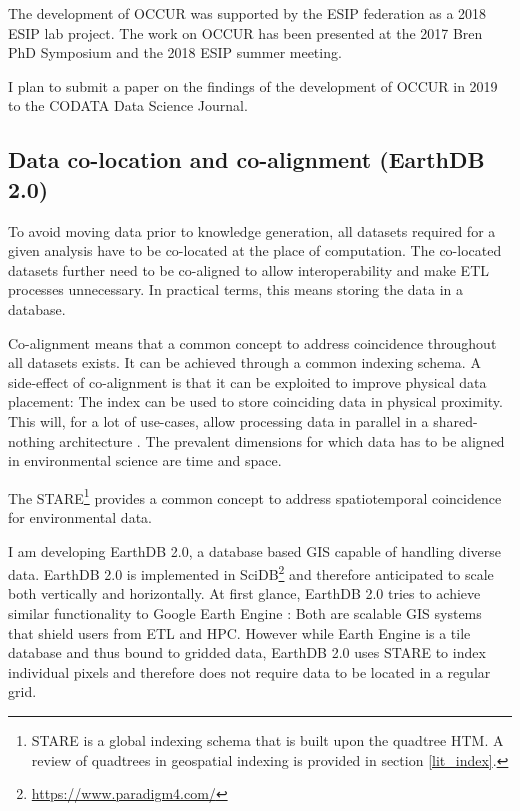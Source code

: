 \documentclass[letterpaper, parskip=half]{scrartcl}
\begin{document}
The development of \gls{OCCUR} was supported by the \gls{ESIP} federation as a 2018 \gls{ESIP} lab project. The work on \gls{OCCUR} has been presented at the 2017 Bren PhD Symposium and the 2018 \gls{ESIP} summer meeting.

I plan to submit a paper on the findings of the development of OCCUR in 2019 to the CODATA Data Science Journal.
% 
\newpage

\subsection{Data co-location and co-alignment (EarthDB 2.0)}
To avoid moving data prior to knowledge generation, all datasets required for a given analysis have to be co-located at the place of computation. The co-located datasets further need to be co-aligned to allow interoperability \citep{Kuo2017, Rilee2016} and make \gls{ETL} processes unnecessary. In practical terms, this means storing the data in a database.

Co-alignment means that a common concept to address coincidence throughout all datasets exists. 
It can be achieved through a common indexing schema. A side-effect of co-alignment is that it can be exploited to improve physical data placement: The index can be used to store coinciding data in physical proximity. This will, for a lot of use-cases, allow processing data in parallel in a shared-nothing architecture \citep{Kuo2017}.
The prevalent dimensions for which data has to be aligned in environmental science are time and space.
 
The \gls{STARE}\footnote{STARE is a global indexing schema that is built upon the quadtree \gls{HTM}. A review of quadtrees in geospatial indexing is provided in section \ref{lit_index}.} \citep{Kuo2017} provides a common concept to address spatiotemporal coincidence for environmental data.

I am developing EarthDB 2.0, a database based \gls{GIS} capable of handling diverse data. 
EarthDB 2.0 is implemented in SciDB\footnote{\url{https://www.paradigm4.com/}} and therefore anticipated to scale both vertically and horizontally.
At first glance, EarthDB 2.0 tries to achieve similar functionality to Google Earth Engine \citep{Gorelick2017}: Both are scalable \gls{GIS} systems that shield users from \gls{ETL} and \gls{HPC}. However while Earth Engine is a tile database and thus bound to gridded data, EarthDB 2.0 uses \gls{STARE} to index individual pixels and therefore does not require data to be located in a regular grid. 
\end{document}
